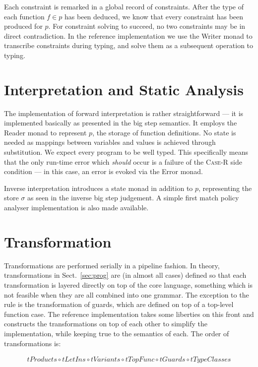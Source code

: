 Each constraint is remarked in a global record of constraints. After the type
of each function $f \in p$ has been deduced, we know that every constraint has
been produced for $p$. For constraint solving to succeed, no two constraints
may be in direct contradiction. In the reference implementation we use the
Writer monad to transcribe constraints during typing, and solve them as a
subsequent operation to typing.

\section{Interpretation and Static Analysis}

The implementation of forward interpretation is rather straightforward --- it
is implemented basically as presented in the big step semantics. It employs the
Reader monad to represent $p$, the storage of function definitions. No state is
needed as mappings between variables and values is achieved through
substitution. We expect every program to be well typed. This specifically means
that the only run-time error which \emph{should} occur is a failure of the
\textsc{Case-R} side condition --- in this case, an error is evoked via the
Error monad.

Inverse interpretation introduces a state monad in addition to $p$,
representing the store $\sigma$ as seen in the inverse big step judgement. A
simple first match policy analyser implementation is also made available.

\section{Transformation}

Transformations are performed serially in a pipeline fashion. In theory,
transformations in Sect.~\ref{sec:prog} are (in almost all cases) defined so
that each transformation is layered directly on top of the core language,
something which is not feasible when they are all combined into one grammar.
The exception to the rule is the transformation of guards, which are defined on
top of a top-level function case. The reference implementation takes some
liberties on this front and constructs the transformations on top of each
other to simplify the implementation, while keeping true to the semantics of
each. The order of transformations is:

\begin{align*}
  tProducts \circ tLetIns \circ tVariants \circ tTopFunc \circ tGuards \circ tTypeClasses
\end{align*}

